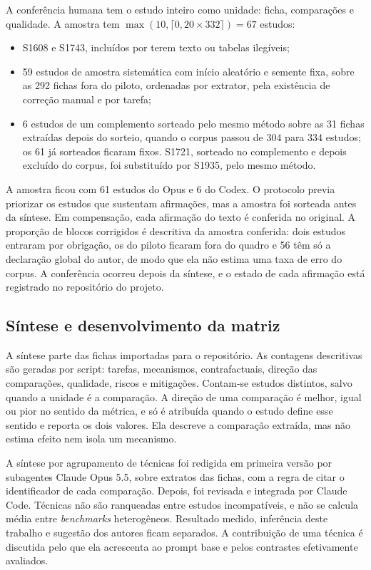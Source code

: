 A conferência humana tem o estudo inteiro como unidade: ficha, comparações e qualidade. A amostra tem
$\max(10, \lceil 0{,}20 \times 332\rceil) = 67$ estudos:
\begin{itemize}
  \item S1608 e S1743, incluídos por terem texto ou tabelas ilegíveis;
  \item 59 estudos de amostra sistemática com início aleatório e semente fixa, sobre as 292 fichas fora do piloto,
  ordenadas por extrator, pela existência de correção manual e por tarefa;
  \item 6 estudos de um complemento sorteado pelo mesmo método sobre as 31 fichas extraídas depois do sorteio,
  quando o corpus passou de 304 para 334 estudos; os 61 já sorteados ficaram fixos. S1721, sorteado no complemento
  e depois excluído do corpus, foi substituído por S1935, pelo mesmo método.
\end{itemize}
A amostra ficou com 61 estudos do Opus e 6 do Codex. O protocolo previa priorizar os estudos que sustentam
afirmações, mas a amostra foi sorteada antes da síntese. Em compensação, cada afirmação do texto é conferida no
original. A proporção de blocos corrigidos é descritiva da
amostra conferida: dois estudos entraram por obrigação, os do piloto ficaram fora do quadro e 56 têm só a declaração
global do autor, de modo que ela não estima uma taxa de erro do corpus. A
conferência ocorreu depois da síntese, e o estado de cada afirmação está registrado no repositório do projeto.

\subsection{Síntese e desenvolvimento da matriz}
A síntese parte das fichas importadas para o repositório. As contagens descritivas são geradas por script:
tarefas, mecanismos, contrafactuais, direção das comparações, qualidade, riscos e mitigações. Contam-se estudos
distintos, salvo quando a unidade é a comparação. A direção de uma comparação é melhor, igual ou pior no sentido
da métrica, e só é atribuída quando o estudo define esse sentido e reporta os dois valores. Ela descreve a
comparação extraída, mas não estima efeito nem isola um mecanismo.

A síntese por agrupamento de técnicas foi redigida em primeira versão por subagentes Claude Opus 5.5, sobre
extratos das fichas, com a regra de citar o identificador de cada comparação. Depois, foi revisada e integrada por
Claude Code. Técnicas não são ranqueadas entre estudos incompatíveis, e não se calcula média entre
\textit{benchmarks} heterogêneos. Resultado medido, inferência deste trabalho e sugestão dos autores ficam
separados. A contribuição de uma técnica é discutida pelo que ela acrescenta ao prompt base e pelos contrastes
efetivamente avaliados.

